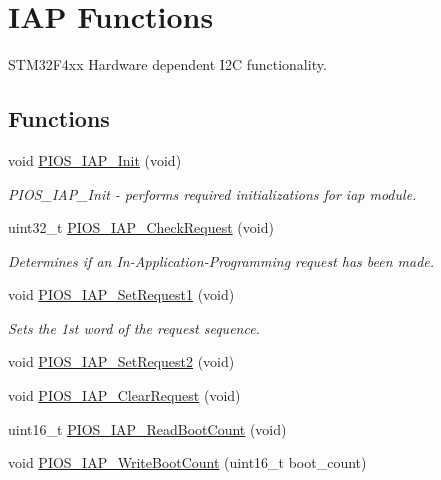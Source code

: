 \hypertarget{group___p_i_o_s___i_a_p}{\section{\-I\-A\-P \-Functions}
\label{group___p_i_o_s___i_a_p}
}


\-S\-T\-M32\-F4xx \-Hardware dependent \-I2\-C functionality.  


\subsection*{\-Functions}
\begin{DoxyCompactItemize}
\item 
void \hyperlink{group___p_i_o_s___i_a_p_ga934ab6403364f7db094874c8b22ac39b}{\-P\-I\-O\-S\-\_\-\-I\-A\-P\-\_\-\-Init} (void)
\begin{DoxyCompactList}\small\item\em \-P\-I\-O\-S\-\_\-\-I\-A\-P\-\_\-\-Init -\/ performs required initializations for iap module. \end{DoxyCompactList}\item 
uint32\-\_\-t \hyperlink{group___p_i_o_s___i_a_p_ga727e2ab4e4516e678c92361691368cde}{\-P\-I\-O\-S\-\_\-\-I\-A\-P\-\_\-\-Check\-Request} (void)
\begin{DoxyCompactList}\small\item\em \-Determines if an \-In-\/\-Application-\/\-Programming request has been made. \end{DoxyCompactList}\item 
void \hyperlink{group___p_i_o_s___i_a_p_ga61d5d14426b73d8107cbed60770fcb60}{\-P\-I\-O\-S\-\_\-\-I\-A\-P\-\_\-\-Set\-Request1} (void)
\begin{DoxyCompactList}\small\item\em \-Sets the 1st word of the request sequence. \end{DoxyCompactList}\item 
void \hyperlink{group___p_i_o_s___i_a_p_ga479699ab37d0c0277f93ac0b999d535c}{\-P\-I\-O\-S\-\_\-\-I\-A\-P\-\_\-\-Set\-Request2} (void)
\item 
void \hyperlink{group___p_i_o_s___i_a_p_gaac06a8f0df9d20557e2fd6db4cec035f}{\-P\-I\-O\-S\-\_\-\-I\-A\-P\-\_\-\-Clear\-Request} (void)
\item 
uint16\-\_\-t \hyperlink{group___p_i_o_s___i_a_p_ga6d7dd1f71491af968d9770b090d0f5d1}{\-P\-I\-O\-S\-\_\-\-I\-A\-P\-\_\-\-Read\-Boot\-Count} (void)
\item 
void \hyperlink{group___p_i_o_s___i_a_p_ga492cacc4144a710d8c9652b1acb95631}{\-P\-I\-O\-S\-\_\-\-I\-A\-P\-\_\-\-Write\-Boot\-Count} (uint16\-\_\-t boot\-\_\-count)
\end{DoxyCompactItemize}


